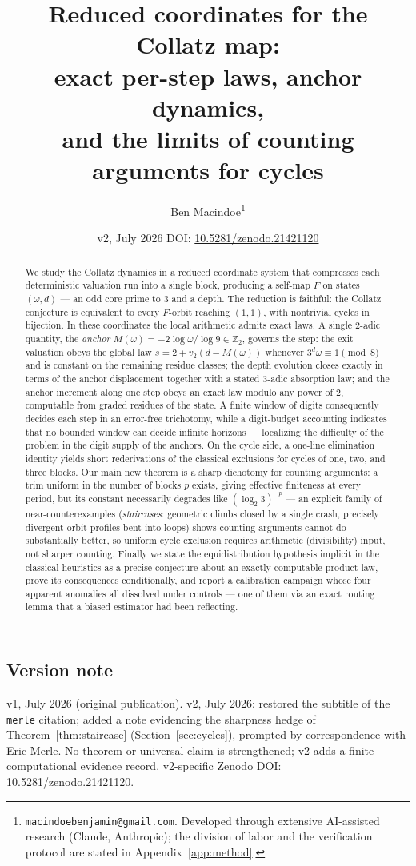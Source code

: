 \documentclass[11pt]{article}
\title{Reduced coordinates for the Collatz map:\\ exact per-step laws, anchor dynamics,\\ and the limits of counting arguments for cycles}
\author{Ben Macindoe\thanks{\texttt{macindoebenjamin@gmail.com}. Developed through extensive AI-assisted research (Claude, Anthropic); the division of labor and the verification protocol are stated in Appendix~\ref{app:method}.}}
\date{v2, July 2026 \;\cdot\; DOI: \href{https://doi.org/10.5281/zenodo.21421120}{10.5281/zenodo.21421120}}
\theoremstyle{remark}
\newcommand{\Z}{\mathbb{Z}}
\newcommand{\vt}[1]{v_2\!\left(#1\right)}
\newcommand{\w}{\omega}
\newcommand{\LL}{\log_2 3}
\begin{document}
\maketitle

\begin{abstract}
We study the Collatz dynamics in a reduced coordinate system that compresses each deterministic valuation run into a single block, producing a self-map $F$ on states $(\w,d)$ --- an odd core prime to $3$ and a depth. The reduction is faithful: the Collatz conjecture is equivalent to every $F$-orbit reaching $(1,1)$, with nontrivial cycles in bijection. In these coordinates the local arithmetic admits exact laws. A single $2$-adic quantity, the \emph{anchor} $M(\w) = -2\log\w/\log 9 \in \Z_2$, governs the step: the exit valuation obeys the global law $s = 2 + \vt{d - M(\w)}$ whenever $3^d\w \equiv 1 \pmod 8$ and is constant on the remaining residue classes; the depth evolution closes exactly in terms of the anchor displacement together with a stated $3$-adic absorption law; and the anchor increment along one step obeys an exact law modulo any power of $2$, computable from graded residues of the state. A finite window of digits consequently decides each step in an error-free trichotomy, while a digit-budget accounting indicates that no bounded window can decide infinite horizons --- localizing the difficulty of the problem in the digit supply of the anchors. On the cycle side, a one-line elimination identity yields short rederivations of the classical exclusions for cycles of one, two, and three blocks. Our main new theorem is a sharp dichotomy for counting arguments: a trim uniform in the number of blocks $p$ exists, giving effective finiteness at every period, but its constant necessarily degrades like $(\LL)^{-p}$ --- an explicit family of near-counterexamples (\emph{staircases}: geometric climbs closed by a single crash, precisely divergent-orbit profiles bent into loops) shows counting arguments cannot do substantially better, so uniform cycle exclusion requires arithmetic (divisibility) input, not sharper counting. Finally we state the equidistribution hypothesis implicit in the classical heuristics as a precise conjecture about an exactly computable product law, prove its consequences conditionally, and report a calibration campaign whose four apparent anomalies all dissolved under controls --- one of them via an exact routing lemma that a biased estimator had been reflecting.
\end{abstract}

\subsection*{Version note}
v1, July 2026 (original publication). v2, July 2026: restored the subtitle of the \texttt{merle} citation; added a note evidencing the sharpness hedge of Theorem~\ref{thm:staircase} (Section~\ref{sec:cycles}), prompted by correspondence with Eric Merle. No theorem or universal claim is strengthened; v2 adds a finite computational evidence record. v2-specific Zenodo DOI: 10.5281/zenodo.21421120.
\end{document}
